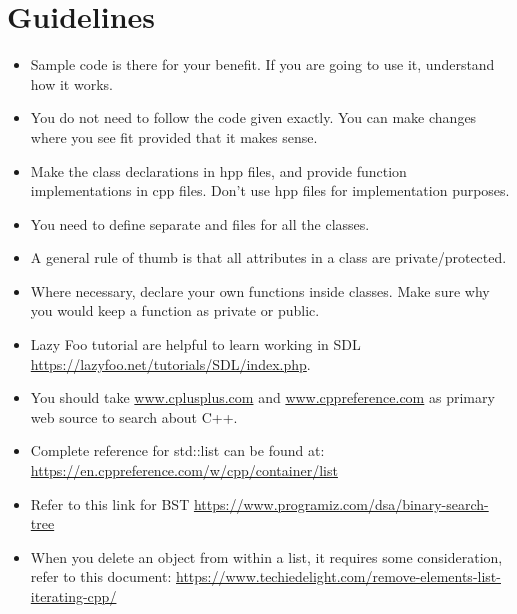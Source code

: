 \documentclass[a4paper,12pt]{article}
\begin{document}
	\section{Guidelines}
	\begin{itemize}
		\item Sample code is there for your benefit. If you are going to use it, understand how it works. 
		
		\item You do not need to follow the code given exactly. You can make changes where you see fit provided that it makes sense.
		
		\item Make the class declarations in hpp files, and provide function implementations in cpp files. Don't use hpp files for implementation purposes.
		
		\item You need to define separate  and  files for all the classes.
		
		\item A general rule of thumb is that all attributes in a class are private/protected.
		
		\item Where necessary, declare your own functions inside classes. Make sure why you would keep a function as private or public.	

		\item Lazy Foo tutorial are helpful to learn working in SDL \url{https://lazyfoo.net/tutorials/SDL/index.php}. 
		
		\item You should take \url{www.cplusplus.com} and \url{www.cppreference.com} as primary web source to search about C++.
		
		\item Complete reference for std::list can be found at: \url{https://en.cppreference.com/w/cpp/container/list}
		
		\item Refer to this link for BST \url{https://www.programiz.com/dsa/binary-search-tree}
		
		\item When you delete an object from within a list, it requires some consideration, refer to this document: \url{https://www.techiedelight.com/remove-elements-list-iterating-cpp/}
	\end{itemize}
\end{document}
